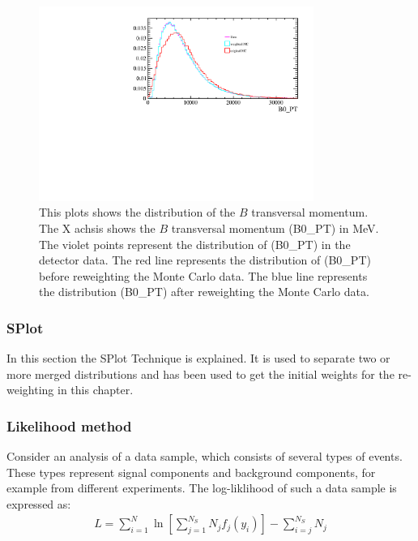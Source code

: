 \documentclass[english]{uzhpub}
\begin{document}
\begin{figure}[H]
\centering
\includegraphics[width=0.8\textwidth]{Reweighting/B0_PT}
\caption{This plots shows the distribution of the $B$ transversal momentum. The X achsis shows the $B$ transversal momentum (B0\_PT) in MeV. The violet points represent the distribution of (B0\_PT) in the detector data.
The red line represents the distribution of (B0\_PT) before reweighting the Monte Carlo data.
The blue line represents the distribution (B0\_PT) after reweighting the Monte Carlo data. }
\label{fig:B0_PT}
\end{figure}




 \subsubsection{SPlot}
In this section the SPlot Technique is explained. It is used to separate two or more merged distributions and  has been used to get the initial weights for the re-weighting in this chapter.

 \subsubsection*{Likelihood method}
 Consider an analysis of a data sample, which consists of several types of events. These types represent signal components and background components, for example from different experiments. The log-liklihood of such a data sample is expressed as:
 \begin{align}
  L = \sum_{i=1}^{N} \ln \left[ \sum_{j=1}^{N_S} N_j f_j (y_i) \right] - \sum_{i=j}^{N_S} N_j \label{eq:L}
 \end{align}
\end{document}
